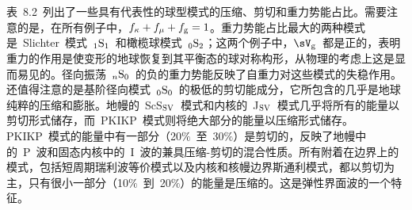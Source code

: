 {\enlargethispage{-0.5\baselineskip}
表~8.2~列出了一些具有代表性的球型模式的压缩、剪切和重力势能占比。需要注意的是，在所有例子中，$f_{\kappa}+f_{\mu}+
f_{\rm g}=1$。重力势能占比最大的两种模式是~Slichter~模式~${}_1{\rm S}_1$~和橄榄球模式~${}_0{\rm S}_2$；这两个例子中，$\sV_{\rm g}$~都是正的，表明重力的作用是使变形的地球恢复到其平衡态的球对称构形，从物理的考虑上这是显而易见的。径向振荡~${}_n{\rm S}_0$~的负的重力势能反映了自重力对这些模式的失稳作用。还值得注意的是基阶径向模式~${}_0{\rm S}_0$~的极低的剪切能成分，它所包含的几乎是地球纯粹的压缩和膨胀。地幔的~ScS${}_{\rm SV}$~模式和内核的~J${}_{\rm SV}$~模式几乎将所有的能量以剪切形式储存，而~PKIKP~模式则将绝大部分的能量以压缩形式储存。PKIKP~模式的能量中有一部分（20$\%$~至~30$\%$）是剪切的，反映了地幔中的~P~波和固态内核中的~I~波的兼具压缩-剪切的混合性质。所有附着在边界上的模式，包括短周期瑞利波等价模式以及内核和核幔边界斯通利模式，都以剪切为主，只有很小一部分（10$\%$~到~20$\%$）的能量是压缩的。这是弹性界面波的一个特征。

}
